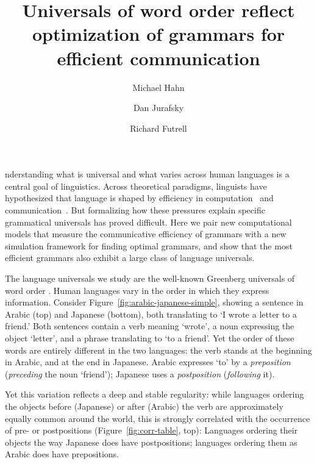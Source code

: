 \documentclass[9pt,twocolumn,twoside,lineno]{pnas-new}
\title{Universals of word order reflect optimization of grammars for efficient communication}
\author[a,1]{Michael Hahn}
\author[a]{Dan Jurafsky}
\author[b]{Richard Futrell}
\affil[a]{Stanford University}
\affil[b]{University of California, Irvine}
\begin{document}
\maketitle
\thispagestyle{firststyle}


nderstanding what is universal and what varies across human languages is a central goal of linguistics.
Across theoretical paradigms, linguists have hypothesized that language is shaped by efficiency in computation~\cite{chomsky2005three,hauser2002faculty, berwick1984grammatical,hawkins1994performance} and communication~\cite{zipf1949human, Croft:Cruse:2004, Goldberg:2005, kirby2015compression, pinker1990natural, nowak1999evolution}. %
But formalizing how these pressures explain specific grammatical universals has proved difficult.
Here we pair new computational models that measure the communicative efficiency of grammars with a new simulation framework for finding optimal grammars, and show that the most efficient grammars also exhibit a large class of language universals. %

The language universals we study are the well-known Greenberg universals of word order \cite{greenberg1963universals}. 
Human languages vary in the order in which they express information.
Consider Figure~\ref{fig:arabic-japanese-simple}, showing a sentence in Arabic (top) and Japanese (bottom), both translating to `I wrote a letter to a friend.'
Both sentences contain a verb meaning `wrote', a noun expressing  the object `letter', and a phrase translating to `to a friend'.
Yet the order of these words are entirely different in the two languages:
the verb stands at the beginning in Arabic, and at the end in Japanese.
Arabic expresses `to' by a \emph{preposition} (\emph{preceding} the noun `friend'); Japanese uses a \emph{postposition} (\emph{following} it). 

Yet this variation reflects a deep and stable regularity:
while languages ordering the objects before (Japanese) or after (Arabic) the verb are approximately equally common around the world,
this is strongly correlated with the occurrence of pre- or postpositions (Figure~\ref{fig:corr-table}, top):
Languages ordering their objects the way Japanese does have postpositions; languages ordering them as Arabic does have prepositions.
\end{document}
